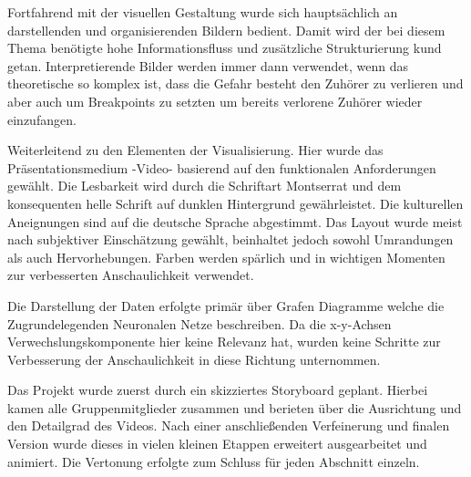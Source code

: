 Fortfahrend mit der visuellen Gestaltung wurde sich hauptsächlich an darstellenden und organisierenden Bildern bedient. Damit wird der bei diesem Thema benötigte hohe Informationsfluss und zusätzliche Strukturierung kund getan. Interpretierende Bilder werden immer dann verwendet, wenn das theoretische so komplex ist, dass die Gefahr besteht den Zuhörer zu verlieren und aber auch um Breakpoints zu setzten um bereits verlorene Zuhörer wieder einzufangen. 

Weiterleitend zu den Elementen der Visualisierung. Hier wurde das Präsentationsmedium -Video- basierend auf den funktionalen Anforderungen gewählt. Die Lesbarkeit wird durch die Schriftart Montserrat und dem konsequenten helle Schrift auf dunklen Hintergrund gewährleistet. Die kulturellen Aneignungen sind auf die deutsche Sprache abgestimmt. Das Layout wurde meist nach subjektiver Einschätzung gewählt, beinhaltet jedoch sowohl Umrandungen als auch Hervorhebungen. Farben werden spärlich und in wichtigen Momenten zur verbesserten Anschaulichkeit verwendet. 

Die Darstellung der Daten erfolgte primär über Grafen Diagramme welche die Zugrundelegenden Neuronalen Netze beschreiben. Da die x-y-Achsen Verwechslungskomponente hier keine Relevanz hat, wurden keine Schritte zur Verbesserung der Anschaulichkeit in diese Richtung unternommen. 

Das Projekt wurde zuerst durch ein skizziertes Storyboard geplant. Hierbei kamen alle Gruppenmitglieder zusammen und berieten über die Ausrichtung und den Detailgrad des Videos. Nach einer anschließenden Verfeinerung und finalen Version wurde dieses in vielen kleinen Etappen erweitert ausgearbeitet und animiert. Die Vertonung erfolgte zum Schluss für jeden Abschnitt einzeln. 

 